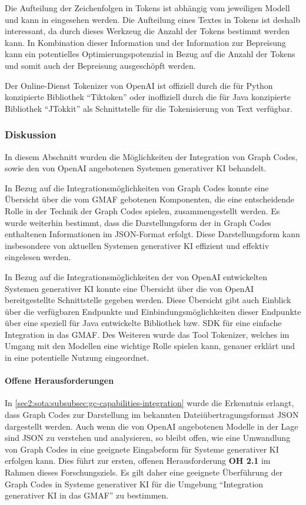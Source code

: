 Die Aufteilung der Zeichenfolgen in Tokens ist abhängig vom jeweiligen Modell und kann in \cite{openai-model-tiktoken} eingesehen werden.
Die Aufteilung eines Textes in Tokens ist deshalb interessant, da durch dieses Werkzeug die Anzahl der Tokens bestimmt werden kann.
In Kombination dieser Information und der Information zur Bepreisung kann ein potentielles Optimierungspotenzial in Bezug auf die Anzahl der Tokens und somit auch der Bepreisung ausgeschöpft werden.

Der Online-Dienst Tokenizer von OpenAI ist offiziell durch die für Python konzipierte Bibliothek \enquote{Tiktoken} \cite{openai-python-tiktoken} oder inoffiziell durch die für Java konzipierte Bibliothek \enquote{JTokkit} \cite{openai-java-jtokkit} als Schnittstelle für die Tokenisierung von Text verfügbar.

\subsubsection{Diskussion}
\label{sec2:sota:subsubsec:fz2:discussion}
In diesem Abschnitt wurden die Möglichkeiten der Integration von Graph Codes, sowie den von OpenAI angebotenen Systemen generativer KI behandelt.

In Bezug auf die Integrationsmöglichkeiten von Graph Codes konnte eine Übersicht über die vom GMAF gebotenen Komponenten, die eine entscheidende Rolle in der Technik der Graph Codes spielen, zusammengestellt werden.
Es wurde weiterhin bestimmt, dass die Darstellungsform der in Graph Codes enthaltenen Informationen im JSON-Format erfolgt.
Diese Darstellungsform kann insbesondere von aktuellen Systemen generativer KI effizient und effektiv eingelesen werden.

In Bezug auf die Integrationsmöglichkeiten der von OpenAI entwickelten Systemen generativer KI konnte eine Übersicht über die von OpenAI bereitgestellte Schnittstelle gegeben werden.
Diese Übersicht gibt auch Einblick über die verfügbaren Endpunkte und Einbindungsmöglichkeiten dieser Endpunkte über eine speziell für Java entwickelte Bibliothek bzw. SDK für eine einfache Integration in das GMAF.
Des Weiteren wurde das Tool Tokenizer, welches im Umgang mit den Modellen eine wichtige Rolle spielen kann, genauer erklärt und in eine potentielle Nutzung eingeordnet.

\paragraph{Offene Herausforderungen}
\label{sec2:sota:par:fz2:open-challenges}
In \cref{sec2:sota:subsubsec:gc-capabilities-integration} wurde die Erkenntnis erlangt, dass Graph Codes zur Darstellung im bekannten Dateiübertragungsformat JSON dargestellt werden.
Auch wenn die von OpenAI angebotenen Modelle in der Lage sind JSON zu verstehen und analysieren, so bleibt offen, wie eine Umwandlung von Graph Codes in eine geeignete Eingabeform für Systeme generativer KI erfolgen kann.
Dies führt zur ersten, offenen Herausforderung \textbf{OH 2.1} im Rahmen dieses Forschungsziels.
Es gilt daher eine geeignete Überführung der Graph Codes in Systeme generativer KI für die Umgebung \enquote{Integration generativer KI in das GMAF} zu bestimmen.

